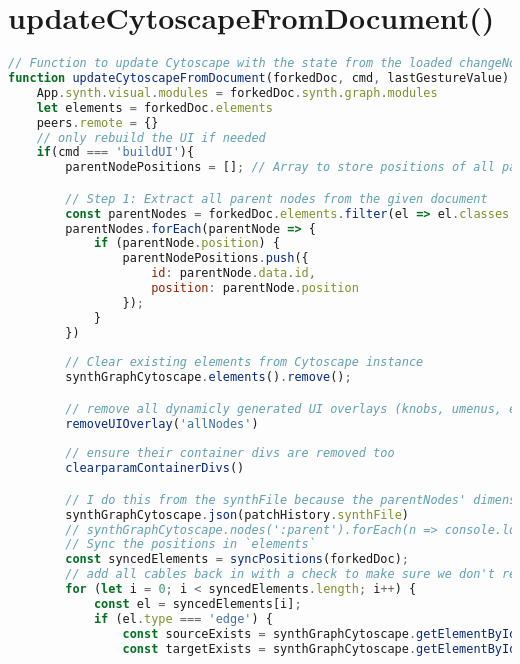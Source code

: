 \section{updateCytoscapeFromDocument()}

\begin{lstlisting}[language=JavaScript, caption={The updateCytoscapeFromDocument() function rebuilds the visual patch graph in Cytoscape.js based on a loaded changeNode document. It supports three modes: buildUI is triggered after loading a .fpsynth synthesizer file and fully reconstructs the interface, including parameter overlays. The default mode responds to changes or version loads initiated by the local player, while buildFromSyncMessage applies state changes received from a remote peer. Since rebuilding UI overlays involves additional computation, the latter two modes skip this step unless overlays are missing and must be regenerated.}, label={lst:updateCytoscapeFromDocument}]
// Function to update Cytoscape with the state from the loaded changeNode doc (referred to here as 'forkedDoc')
function updateCytoscapeFromDocument(forkedDoc, cmd, lastGestureValue) {
    App.synth.visual.modules = forkedDoc.synth.graph.modules
    let elements = forkedDoc.elements
    peers.remote = {}
    // only rebuild the UI if needed
    if(cmd === 'buildUI'){
        parentNodePositions = []; // Array to store positions of all parent nodes

        // Step 1: Extract all parent nodes from the given document
        const parentNodes = forkedDoc.elements.filter(el => el.classes === ':parent'); // Adjust based on your schema
        parentNodes.forEach(parentNode => {
            if (parentNode.position) {
                parentNodePositions.push({
                    id: parentNode.data.id,
                    position: parentNode.position
                });
            }
        })
        
        // Clear existing elements from Cytoscape instance
        synthGraphCytoscape.elements().remove();

        // remove all dynamicly generated UI overlays (knobs, umenus, etc)
        removeUIOverlay('allNodes')
        
        // ensure their container divs are removed too
        clearparamContainerDivs()

        // I do this from the synthFile because the parentNodes' dimensions respond to their childs' positioning
        synthGraphCytoscape.json(patchHistory.synthFile)
        // synthGraphCytoscape.nodes(':parent').forEach(n => console.log(n.id())); // lock all parent nodes so they can't be dragged
        // Sync the positions in `elements`
        const syncedElements = syncPositions(forkedDoc);
        // add all cables back in with a check to make sure we don't render edges to empty parent nodes
        for (let i = 0; i < syncedElements.length; i++) {
            const el = syncedElements[i];
            if (el.type === 'edge') {
                const sourceExists = synthGraphCytoscape.getElementById(el.data.source).length > 0;
                const targetExists = synthGraphCytoscape.getElementById(el.data.target).length > 0;


\end{lstlisting}
